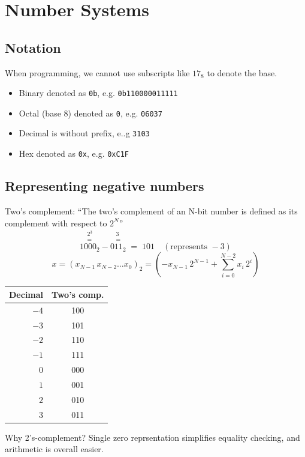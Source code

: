 \documentclass[a4paper, 11pt]{article}
\theoremstyle{definition}
\begin{document}
\section{Number Systems}

\subsection{Notation}
When programming, we cannot use subscripts like ${17}_8$ to denote the base.
\begin{itemize}
    \item Binary denoted as \texttt{0b}, e.g. \texttt{0b110000011111}
    \item Octal (base 8) denoted as \texttt{0}, e.g. \texttt{06037}
    \item Decimal is without prefix, e..g \texttt{3103}
    \item Hex denoted as \texttt{0x}, e.g. \texttt{0xC1F}
\end{itemize}

\subsection{Representing negative numbers}
Two's complement: ``The two's complement of an N-bit number is defined as its complement with respect to $2^N$''
\[
\overset{\substack{2^3 \\ =}}{1000_2} - \overset{\substack{3 \\ =}}{011_2}
\;=\; 101 \quad (\text{represents } -3)
\]
\[
x = (x_{N-1}\, x_{N-2} \ldots x_0)_2
  = \left( -x_{N-1}\, 2^{N-1} + \sum_{i=0}^{N-2} x_i\, 2^i \right)
\]
\begin{center}
\begin{tabular}{rc}
    \toprule
    \textbf{Decimal} & \textbf{Two's comp.} \\
    \midrule
    $-4$ & 100 \\
    $-3$ & 101 \\
    $-2$ & 110 \\
    $-1$ & 111 \\
    $0$  & 000 \\
    $1$  & 001 \\
    $2$  & 010 \\
    $3$  & 011 \\
    \bottomrule
\end{tabular}
\end{center}
Why 2's-complement? Single zero reprsentation simplifies equality checking, and arithmetic is overall easier.
\end{document}
